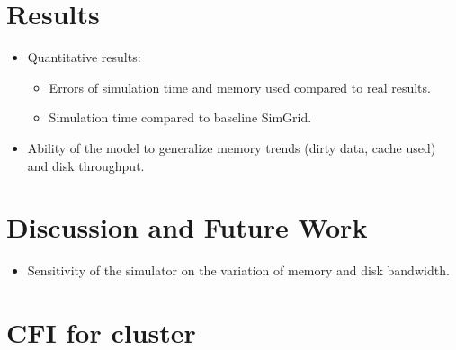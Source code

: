 \documentclass[conference]{IEEEtran}
\begin{document}
	\section{Results}
	
		\begin{itemize}

			\item Quantitative results: 
				\begin{itemize}
					\item Errors of simulation time and memory used compared to real results.
					\item Simulation time compared to baseline SimGrid.
				\end{itemize} 

			\item Ability of the model to generalize memory trends (dirty data, cache used) and disk throughput.

		\end{itemize}

	\section{Discussion and Future Work}
		\begin{itemize}
			\item Sensitivity of the simulator on the variation of memory and disk bandwidth. 
		\end{itemize}
	\section{CFI for cluster}


\end{document}
